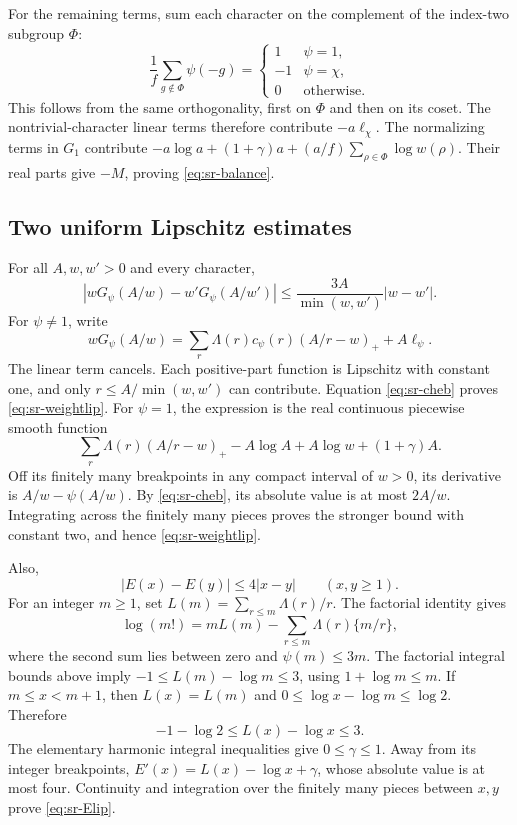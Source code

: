 For the remaining terms, sum each character on the complement of
the index-two subgroup \(\Phi\):
\[
 \frac1f\sum_{g\notin\Phi}\psi(-g)
 =\begin{cases}1&\psi=1,\\-1&\psi=\chi,\\0&\text{otherwise}.\end{cases}
\]
This follows from the same orthogonality, first on \(\Phi\) and then
on its coset. The nontrivial-character linear terms therefore contribute
\(-a\ell_\chi\).
The normalizing terms in \(G_1\) contribute
\(-a\log a+(1+\gamma)a+(a/f)\sum_{\rho\in\Phi}\log w(\rho)\).
Their real parts give \(-M\), proving \eqref{eq:sr-balance}.

\subsection{Two uniform Lipschitz estimates}
For all \(A,w,w'>0\) and every character,
\begin{equation}\label{eq:sr-weightlip}
 |wG_\psi(A/w)-w'G_\psi(A/w')|
 \leq\frac{3A}{\min(w,w')}|w-w'|.
\end{equation}
For \(\psi\ne1\), write
\[
 wG_\psi(A/w)=\sum_r\Lambda(r)c_\psi(r)(A/r-w)_++A\ell_\psi .
\]
The linear term cancels. Each positive-part function is Lipschitz with
constant one, and only \(r\leq A/\min(w,w')\) can contribute.
Equation \eqref{eq:sr-cheb} proves \eqref{eq:sr-weightlip}.
For \(\psi=1\), the expression is the real continuous piecewise smooth
function
\[
 \sum_r\Lambda(r)(A/r-w)_+-A\log A+A\log w+(1+\gamma)A.
\]
Off its finitely many breakpoints in any compact interval of \(w>0\),
its derivative is \(A/w-\psi(A/w)\).
By \eqref{eq:sr-cheb}, its absolute value is at most \(2A/w\).
Integrating across the finitely many pieces proves the stronger bound
with constant two, and hence \eqref{eq:sr-weightlip}.

Also,
\begin{equation}\label{eq:sr-Elip}
 |E(x)-E(y)|\leq4|x-y|\qquad(x,y\geq1).
\end{equation}
For an integer \(m\geq1\), set \(L(m)=\sum_{r\leq m}\Lambda(r)/r\).
The factorial identity gives
\[
 \log(m!)=mL(m)-\sum_{r\leq m}\Lambda(r)\{m/r\},
\]
where the second sum lies between zero and \(\psi(m)\leq3m\).
The factorial integral bounds above imply
\(-1\leq L(m)-\log m\leq3\), using
\(1+\log m\leq m\).
If \(m\leq x<m+1\), then \(L(x)=L(m)\) and
\(0\leq\log x-\log m\leq\log2\). Therefore
\[
 -1-\log2\leq L(x)-\log x\leq3.
\]
The elementary harmonic integral inequalities give \(0\leq\gamma\leq1\).
Away from its integer breakpoints,
\(E'(x)=L(x)-\log x+\gamma\), whose absolute value is at most four.
Continuity and integration over the finitely many pieces between \(x,y\)
prove \eqref{eq:sr-Elip}.

